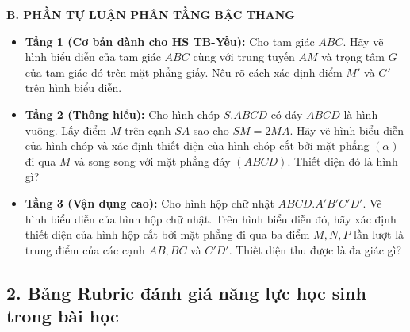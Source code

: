 \documentclass[12pt, a4paper]{article}
\begin{document}
\noindent \textbf{B. PHẦN TỰ LUẬN PHÂN TẦNG BẬC THANG}
\begin{itemize}[leftmargin=0.6cm]
    \item \textbf{Tầng 1 (Cơ bản dành cho HS TB-Yếu):}
    Cho tam giác $ABC$. Hãy vẽ hình biểu diễn của tam giác $ABC$ cùng với trung tuyến $AM$ và trọng tâm $G$ của tam giác đó trên mặt phẳng giấy. Nêu rõ cách xác định điểm $M'$ và $G'$ trên hình biểu diễn.

    \item \textbf{Tầng 2 (Thông hiểu):}
    Cho hình chóp $S.ABCD$ có đáy $ABCD$ là hình vuông. Lấy điểm $M$ trên cạnh $SA$ sao cho $SM = 2MA$. Hãy vẽ hình biểu diễn của hình chóp và xác định thiết diện của hình chóp cắt bởi mặt phẳng $(\alpha)$ đi qua $M$ và song song với mặt phẳng đáy $(ABCD)$. Thiết diện đó là hình gì?

    \item \textbf{Tầng 3 (Vận dụng cao):}
    Cho hình hộp chữ nhật $ABCD.A'B'C'D'$. Vẽ hình biểu diễn của hình hộp chữ nhật. Trên hình biểu diễn đó, hãy xác định thiết diện của hình hộp cắt bởi mặt phẳng đi qua ba điểm $M, N, P$ lần lượt là trung điểm của các cạnh $AB, BC$ và $C'D'$. Thiết diện thu được là đa giác gì?
\end{itemize}

\subsection*{2. Bảng Rubric đánh giá năng lực học sinh trong bài học}
\end{document}
